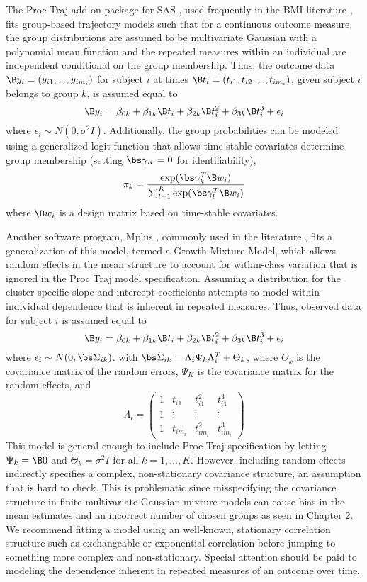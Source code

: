 The Proc Traj add-on package for SAS \cite{jones2001}, used frequently in the BMI literature \cite{pryor2011,carter2012}, fits group-based trajectory models such that for a continuous outcome measure, the group distributions are assumed to be multivariate Gaussian with a polynomial mean function and the repeated measures within an individual are independent conditional on the group membership. Thus, the outcome data $\B y_{i} = (y_{i1},...,y_{im_{i}})$ for subject $i$ at times $\B t_{i} = (t_{i1},t_{i2},...,t_{im_{i}})$, given subject $i$ belongs to group $k$, is assumed equal to
$$\B y_{i} = \beta_{0k}+\beta_{1k} \B t_{i} + \beta_{2k}\B t_{i}^{2}+ \beta_{3k} \B t_{i}^{3} + \epsilon_{i}$$
where $\epsilon_{i}\sim N(0,\sigma^{2}I)$. Additionally, the group probabilities can be modeled using a generalized logit function that allows time-stable covariates determine group membership (setting $\bs\gamma_{K}=0$ for identifiability),
$$\pi_{k}=\frac{\exp(\bs\gamma_{k}^{T}\B w_{i})}{\sum^{K}_{l=1}\exp(\bs\gamma_{l}^{T}\B w_{i})}$$
where $\B w_{i}$ is a design matrix based on time-stable covariates. 

Another software program, Mplus \cite{muthen2010}, commonly used in the literature \cite{li2007,garden2012}, fits a generalization of this model, termed a Growth Mixture Model, which allows random effects in the mean structure to account for within-class variation that is ignored in the Proc Traj model specification. Assuming a distribution for the cluster-specific slope and intercept coefficients attempts to model within-individual dependence that is inherent in repeated measures. Thus, observed data for subject $i$ is assumed equal to
$$\B y_{i} = \beta_{0k}+\beta_{1k} \B t_{i} + \beta_{2k}\B t_{i}^{2}+ \beta_{3k} \B t_{i}^{3} + \epsilon_{i}$$
where $\epsilon_{i}\sim N(0,\bs\Sigma_{ik})$. 
with $\bs\Sigma_{ik}=\Lambda_{i}\Psi_{k}\Lambda_{i}^{T}+\Theta_{k}$, where $\Theta_{k}$ is the covariance matrix of the random errors, $\Psi_{K}$ is the covariance matrix for the random effects, and $$\Lambda_{i}=\left(\begin{array}{cccc}1&t_{i1}&t_{i1}^{2}&t_{i1}^{3}\\ 1&\vdots&\vdots&\vdots\\ 1&t_{im_{i}}&t_{im_{i}}^{2}&t_{im_{i}}^{3} \end{array} \right)$$
This model is general enough to include Proc Traj specification by letting $\Psi_{k}=\B 0$ and $\Theta_{k}=\sigma^{2}I$ for all $k=1,...,K$. However, including random effects indirectly specifies a complex, non-stationary covariance structure, an assumption that is hard to check. This is problematic since misspecifying the covariance structure in finite multivariate Gaussian mixture models can cause bias in the mean estimates and an incorrect number of chosen groups as seen in Chapter 2. We recommend fitting a model using an well-known, stationary correlation structure such as exchangeable or exponential correlation before jumping to something more complex and non-stationary. Special attention should be paid to modeling the dependence inherent in repeated measures of an outcome over time.

